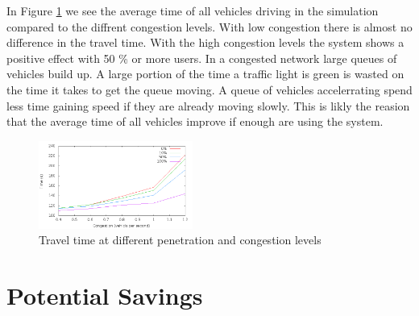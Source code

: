 In Figure \ref{fig:TestResults:congestionTime} we see the average time of all vehicles driving in the simulation compared to the diffrent congestion levels. 
With low congestion there is almost no difference in the travel time.
With the high congestion levels the system shows a positive effect with 50 \% or more users. 
In a congested network large queues of vehicles build up. 
A large portion of the time a traffic light is green is wasted on the time it takes to get the queue moving. 
A queue of vehicles accelerrating spend less time gaining speed if they are already moving slowly. 
This is likly the reasion that the average time of all vehicles improve if enough are using the system.
\begin{figure}[htb]
\includegraphics[width=0.45\textwidth]{../images/timeCongestion.png}
\caption{Travel time at different penetration and congestion levels}
\label{fig:TestResults:congestionTime}
\end{figure}

\section{Potential Savings}

